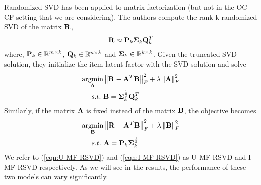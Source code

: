 Randomized SVD has been applied to matrix factorization \citep{Tang:2013} 
(but not in the OC-CF setting that we are considering). 
The authors compute the rank-k randomized SVD of the matrix $\R$,
\begin{align*}
	\R \approx \P_k \Sig_k \Q^T_k
\end{align*}
where, $\P_k \in \mathbb{R}^{m \times k}$, $\Q_k \in \mathbb{R}^{n \times k}$ and $\Sig_k \in \mathbb{R}^{k \times k}$. Given the truncated SVD solution, they initialize the item latent factor with the SVD solution and solve 
\begin{align}
\label{eqn:I-MF-RSVD}
\underset{\A}{\mathrm{argmin}} & \left \| \R - \A^T\B\right \|_F^2 + \lambda \left \|  \A \right \|_F^2   \\
s.t.\ & \B = \Sig_k^{\frac{1}{2}} \Q^T_k \nonumber
\end{align}
Similarly, if the matrix $\A$ is fixed instead of the matrix $\B$, the objective becomes
\begin{align}
\label{eqn:U-MF-RSVD}
\underset{\B}{\mathrm{argmin}} & \left \| \R - \A^T\B\right \|_F^2 + \lambda \left \|  \B \right \|_F^2 \\
s.t.\ & \A = \P_k \Sig_k^{\frac{1}{2}} \nonumber
\end{align}
We refer to (\ref{eqn:U-MF-RSVD}) and (\ref{eqn:I-MF-RSVD}) as U-MF-RSVD and I-MF-RSVD respectively. As we will see in the results, the performance of these two models can vary significantly.
